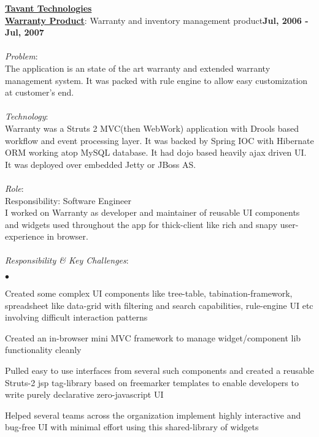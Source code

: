 \documentclass[margin,line]{res}
\newenvironment{list2}{
  \begin{list}{$\bullet$}{%
      \setlength{\itemsep}{0in}
      \setlength{\parsep}{0in} \setlength{\parskip}{0in}
      \setlength{\topsep}{0in} \setlength{\partopsep}{0in} 
      \setlength{\leftmargin}{0.2in}}}{\end{list}}
\begin{document}
\begin{resume}
{\underline {\bf Tavant Technologies}}\\
\vspace{-.1cm}
\href{http://www.tavant.com/solutions/service\_operations/warranty\_index.html}{\bf Warranty Product}: Warranty and inventory management product\hfill {\bf Jul, 2006 - Jul, 2007}\\
\vspace{-.2cm}\\
{\em Problem}:\\
The application is an state of the art warranty and extended warranty management system. It was packed with rule engine to allow easy customization at customer's end.\\
\\
{\em Technology}:\\
Warranty was a Struts 2 MVC(then WebWork) application with Drools based workflow and event processing layer. It was backed by Spring IOC with Hibernate ORM working atop MySQL database. It had dojo based heavily ajax driven UI. It was deployed over embedded Jetty or JBoss AS.\\
\\
{\em Role}: \\
Responsibility: Software Engineer\\
I worked on Warranty as developer and maintainer of reusable UI components and widgets used throughout the app for thick-client like rich and snapy user-experience in browser.\\
\\
{\em Responsibility \& Key Challenges}:

\vspace*{.05in}  
\begin{list2}
\item Created some complex UI components like tree-table, tabination-framework, spreadsheet like data-grid with filtering and search capabilities, rule-engine UI etc involving difficult interaction patterns
\item Created an in-browser mini MVC framework to manage widget/component lib functionality cleanly
\item Pulled easy to use interfaces from several such components and created a reusable Struts-2 jsp tag-library based on freemarker templates to enable developers to write purely declarative zero-javascript UI
\item Helped several teams across the organization implement highly interactive and bug-free UI with minimal effort using this shared-library of widgets
\end{list2}


\end{resume}
\end{document}
